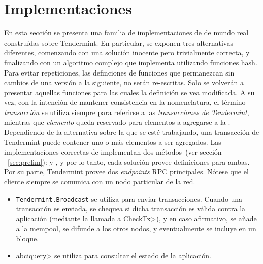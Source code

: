 \section{Implementaciones}\label{sec:impl}

En esta sección se presenta una familia de implementaciones de \setchain de mundo
real construídas sobre Tendermint.
%
En particular, se exponen tres alternativas diferentes, comenzando con una
solución inocente pero trivialmente correcta, y finalizando con un algoritmo
complejo que implementa \setchain utilizando funciones hash.
%
Para evitar repeticiones, las definciones de funciones que permanezcan sin cambios
de una versión a la siguiente, no serán re-escritas.
Solo se volverán a presentar aquellas funciones para las cuales la definición se
vea modificada.
%
A su vez, con la intención de mantener consistencia en la nomenclatura,
el término \textit{transacción} se utiliza siempre para referirse a las
\textit{transacciones de Tendermint}, mientras
que \textit{elemento} queda reservado para elementos a agregarse a la \setchain.
%
Dependiendo de la alternativa sobre la que se esté trabajando, una transacción de
Tendermint puede contener uno o más elementos a ser agregados.
%
Las implementaciones correctas de \setchain implementan dos métodos~(ver sección
~\ref{sec:prelim}): \Add y \Get, y por lo tanto, cada solución provee definiciones
para ambas.
%
Por su parte, Tendermint provee dos \textit{endpoints} RPC principales.
Nótese que el cliente siempre se comunica con un nodo particular de la red.
\begin{itemize}
  \item \texttt{Tendermint.Broadcast} se utiliza para enviar transacciones.
  Cuando una transacción es enviada, se chequea si dicha transacción
  es válida contra la aplicación (mediante la llamada a \<CheckTx>), y en caso
  afirmativo, se añade
  a la mempool, se difunde a los otros nodos, y eventualmente se incluye en
  un bloque.
  \item \<abciquery> se utiliza para consultar el estado de la
  aplicación.
\end{itemize}
%


